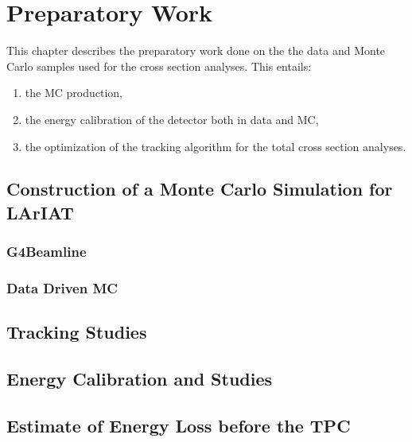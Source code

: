 \chapter{Preparatory Work}\label{ch:samples}
This chapter describes the preparatory work done on the the data and Monte Carlo samples used for the cross section analyses. This entails:

\begin{enumerate}
\item the MC production,
\item the energy calibration of the detector both in data and MC,
\item the optimization of the tracking algorithm for the total cross section analyses.
\end{enumerate}

\section{Construction of a Monte Carlo Simulation for LArIAT}
\subsection{G4Beamline}\label{ch:beamlineComposition}
\subsection{Data Driven MC}\label{sec:DDMC}

\section{Tracking Studies}

\section{Energy Calibration and Studies}

\section{Estimate of Energy Loss before the TPC}

